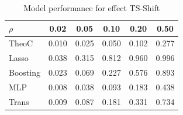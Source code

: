 \documentclass{article}
\begin{document}
\begin{table}[t]\label{table_ts_shift}
    \centering
    \begin{tabular}{lccccc}
\toprule
$\rho$ & 0.02 & 0.05 & 0.10 & 0.20 & 0.50 \\
\midrule
TheoC & {\cellcolor[HTML]{4F69D9}} \color[HTML]{F1F1F1} 0.010 & {\cellcolor[HTML]{3B4CC0}} \color[HTML]{F1F1F1} 0.025 & {\cellcolor[HTML]{3B4CC0}} \color[HTML]{F1F1F1} 0.050 & {\cellcolor[HTML]{3B4CC0}} \color[HTML]{F1F1F1} 0.102 & {\cellcolor[HTML]{3B4CC0}} \color[HTML]{F1F1F1} 0.277 \\
Lasso & {\cellcolor[HTML]{B40426}} \color[HTML]{F1F1F1} 0.038 & {\cellcolor[HTML]{B40426}} \color[HTML]{F1F1F1} 0.315 & {\cellcolor[HTML]{B40426}} \color[HTML]{F1F1F1} 0.812 & {\cellcolor[HTML]{B40426}} \color[HTML]{F1F1F1} 0.960 & {\cellcolor[HTML]{B40426}} \color[HTML]{F1F1F1} 0.996 \\
Boosting & {\cellcolor[HTML]{DDDCDC}} \color[HTML]{000000} 0.023 & {\cellcolor[HTML]{6A8BEF}} \color[HTML]{F1F1F1} 0.069 & {\cellcolor[HTML]{86A9FC}} \color[HTML]{F1F1F1} 0.227 & {\cellcolor[HTML]{EAD5C9}} \color[HTML]{000000} 0.576 & {\cellcolor[HTML]{E26952}} \color[HTML]{F1F1F1} 0.893 \\
MLP & {\cellcolor[HTML]{3B4CC0}} \color[HTML]{F1F1F1} 0.008 & {\cellcolor[HTML]{485FD1}} \color[HTML]{F1F1F1} 0.038 & {\cellcolor[HTML]{4B64D5}} \color[HTML]{F1F1F1} 0.093 & {\cellcolor[HTML]{5875E1}} \color[HTML]{F1F1F1} 0.183 & {\cellcolor[HTML]{84A7FC}} \color[HTML]{F1F1F1} 0.438 \\
Trans & {\cellcolor[HTML]{445ACC}} \color[HTML]{F1F1F1} 0.009 & {\cellcolor[HTML]{80A3FA}} \color[HTML]{F1F1F1} 0.087 & {\cellcolor[HTML]{7295F4}} \color[HTML]{F1F1F1} 0.181 & {\cellcolor[HTML]{93B5FE}} \color[HTML]{000000} 0.331 & {\cellcolor[HTML]{F5C1A9}} \color[HTML]{000000} 0.734 \\
\bottomrule
\end{tabular}
\vskip 0.05in
\caption{Model performance for effect TS-Shift}
    \label{table_ts_shift}
    \end{table}
\end{document}

